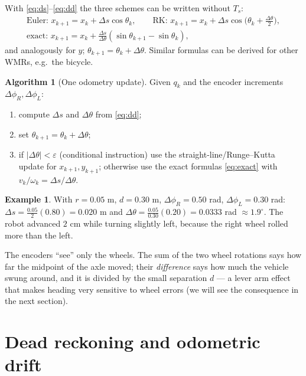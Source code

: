 \documentclass[11pt,a4paper]{article}
\def\boldsymbol#1{#1}%
\newcommand{\Ts}{T_s}
\newcommand{\bq}{\boldsymbol{q}}
\newcommand{\slides}[1]{\texorpdfstring{\hspace{0.5em}{\normalfont\small\emph{(#1)}}}{}}
\theoremstyle{definition}
\newtheorem{example}[definition]{Example}
\newtheorem{algorithm}[definition]{Algorithm}
\theoremstyle{plain}
\theoremstyle{remark}
\begin{document}
With \eqref{eq:ds}--\eqref{eq:dd} the three schemes can be written without $\Ts$:
\begin{gather*}
\text{Euler: } x_{k+1}=x_k+\Delta s\cos\theta_k,\qquad
\text{RK: } x_{k+1}=x_k+\Delta s\cos\!\big(\theta_k+\tfrac{\Delta\theta}2\big),\\
\text{exact: } x_{k+1}=x_k+\tfrac{\Delta s}{\Delta\theta}(\sin\theta_{k+1}-\sin\theta_k),
\end{gather*}
and analogously for $y$; $\theta_{k+1}=\theta_k+\Delta\theta$. Similar formulas can be derived for
other WMRs, e.g.\ the bicycle.

\begin{algorithm}[One odometry update]\label{alg:odo}
Given $\bq_k$ and the encoder increments $\Delta\phi_R,\Delta\phi_L$:
\begin{enumerate}
\item compute $\Delta s$ and $\Delta\theta$ from \eqref{eq:dd};
\item set $\theta_{k+1}=\theta_k+\Delta\theta$;
\item if $|\Delta\theta|<\varepsilon$ (conditional instruction) use the straight-line/Runge--Kutta update for $x_{k+1},y_{k+1}$;
otherwise use the exact formulas \eqref{eq:exact} with $v_k/\omega_k=\Delta s/\Delta\theta$.
\end{enumerate}
\end{algorithm}

\begin{example}
With $r=0.05$ m, $d=0.30$ m, $\Delta\phi_R=0.50$ rad, $\Delta\phi_L=0.30$ rad:
$\Delta s=\tfrac{0.05}{2}(0.80)=0.020$ m and $\Delta\theta=\tfrac{0.05}{0.30}(0.20)=0.0333$ rad $\approx1.9^\circ$.
The robot advanced $2$ cm while turning slightly left, because the right wheel rolled more than the left.
\end{example}

\begin{intuition}
The encoders ``see'' only the wheels. The sum of the two wheel rotations says how far the midpoint of the
axle moved; their \emph{difference} says how much the vehicle swung around, and it is divided by the small
separation $d$ --- a lever arm effect that makes heading very sensitive to wheel errors (we will see the
consequence in the next section).
\end{intuition}

\section{Dead reckoning and odometric drift \slides{odometry deck, slides 8--9}}
\end{document}
